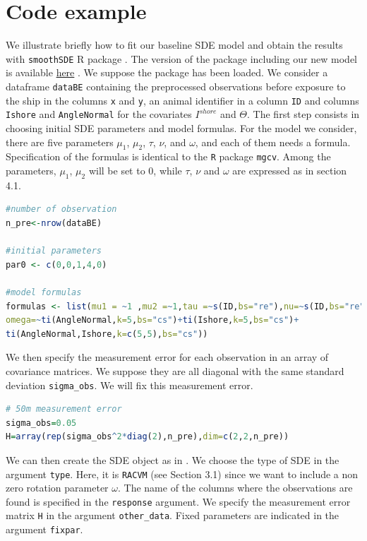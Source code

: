 \documentclass[aoas]{imsart}
\theoremstyle{definition}
\theoremstyle{remark}
\theoremstyle{remark}
\newcommand {\1}{\mathbb{1}}
\begin{document}
\section{Code example}

We illustrate briefly how to fit our baseline SDE model and obtain the results with \texttt{smoothSDE} R package \cite{michelot_varying-coefficient_2021}. The version of the package including our new model is available \href{https://github.com/alexandre-delporte/smoothSDE}{here} . We suppose the package has been loaded. We consider a dataframe \texttt{dataBE} containing the preprocessed observations before exposure to the ship in the columns \texttt{x} and \texttt{y}, an animal identifier in a column \texttt{ID} and columns \texttt{Ishore} and \texttt{AngleNormal} for the covariates $I^{shore}$ and $\Theta$. The first step consists in choosing initial SDE parameters and model formulas. For the model we consider, there are five parameters $\mu_1$, $\mu_2$, $\tau$, $\nu$, and $\omega$, and each of them needs a formula. Specification of the formulas is identical to the \texttt{R} package \texttt{mgcv}. Among the parameters, $\mu_1$, $\mu_2$ will be set to 0, while $\tau$, $\nu$ and $\omega$ are expressed as in section 4.1.



\begin{lstlisting}[language=R]
#number of observation
n_pre<-nrow(dataBE)

#initial parameters
par0 <- c(0,0,1,4,0)

#model formulas
formulas <- list(mu1 = ~1 ,mu2 =~1,tau =~s(ID,bs="re"),nu=~s(ID,bs="re"),
omega=~ti(AngleNormal,k=5,bs="cs")+ti(Ishore,k=5,bs="cs")+
ti(AngleNormal,Ishore,k=c(5,5),bs="cs"))
\end{lstlisting}

We then specify the measurement error for each observation in an array of covariance matrices. We suppose they are all diagonal with the same standard deviation \texttt{sigma\_obs}. We will fix this measurement error. \\

\begin{lstlisting}[language=R]
# 50m measurement error
sigma_obs=0.05
H=array(rep(sigma_obs^2*diag(2),n_pre),dim=c(2,2,n_pre))
\end{lstlisting}

We can then create the SDE object as in \cite{michelot_varying-coefficient_2021}. We choose the type of SDE in the argument \texttt{type}. Here, it is \texttt{RACVM} (see Section 3.1) since we want to include a non zero rotation parameter $\omega$. The name of the columns where the observations are found is specified in the \texttt{response} argument.
We specify the measurement error matrix \texttt{H} in the argument \texttt{other\_data}. Fixed parameters are indicated in the argument \texttt{fixpar}.
\end{document}
